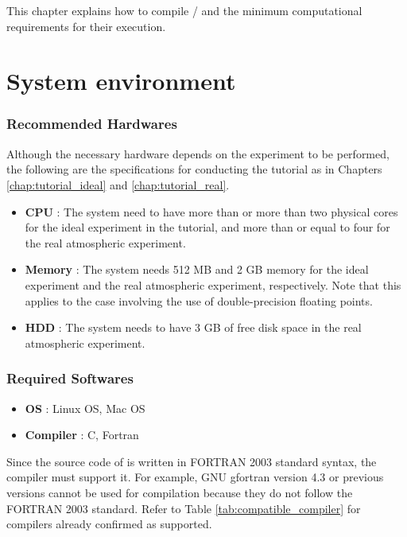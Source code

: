This chapter explains how to compile \scalelib / \scalerm
and the minimum computational requirements for their execution.

\section{System environment} \label{sec:req_env}
\subsubsection{Recommended Hardwares}

  Although the necessary hardware depends on the experiment to be performed,
the following are the specifications for conducting the tutorial as in Chapters \ref{chap:tutorial_ideal} and \ref{chap:tutorial_real}.

  \begin{itemize}
    \item {\bf CPU} :
    The system need to have more than or more than two physical cores for the ideal experiment in the tutorial, and more than or equal to four for the real atmospheric experiment.
    \item {\bf Memory} :
    The system needs 512 MB and 2 GB memory
    for the ideal experiment and the real atmospheric experiment, respectively.
    Note that this applies to the case involving the use of double-precision floating points.
    \item {\bf HDD} : The system needs to have 3 GB of free disk space in the real atmospheric experiment.
  \end{itemize}


\subsubsection{Required Softwares}

  \begin{itemize}
  \item {\bf OS} : Linux OS, Mac OS
  \item {\bf Compiler} : C, Fortran
  \end{itemize}

Since the source code of \scalelib is  written in FORTRAN 2003 standard syntax, the compiler must support it. For example, GNU gfortran version 4.3 or previous versions cannot be used for \scalelib compilation because they do not follow the FORTRAN 2003 standard. Refer to Table \ref{tab:compatible_compiler} for compilers already confirmed as supported.


